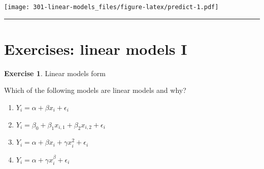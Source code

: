 \documentclass[
]{book}
\newenvironment{Shaded}{\begin{snugshade}}{\end{snugshade}}
\newcommand{\CommentTok}[1]{\textcolor[rgb]{0.56,0.35,0.01}{\textit{#1}}}
\newcommand{\DataTypeTok}[1]{\textcolor[rgb]{0.13,0.29,0.53}{#1}}
\newcommand{\DecValTok}[1]{\textcolor[rgb]{0.00,0.00,0.81}{#1}}
\newcommand{\KeywordTok}[1]{\textcolor[rgb]{0.13,0.29,0.53}{\textbf{#1}}}
\newcommand{\NormalTok}[1]{#1}
\newcommand{\OperatorTok}[1]{\textcolor[rgb]{0.81,0.36,0.00}{\textbf{#1}}}
\newcommand{\StringTok}[1]{\textcolor[rgb]{0.31,0.60,0.02}{#1}}
\providecommand{\tightlist}{%
  \setlength{\itemsep}{0pt}\setlength{\parskip}{0pt}}
\theoremstyle{definition}
\theoremstyle{definition}
\theoremstyle{definition}
\newtheorem{exercise}{Exercise}[chapter]
\theoremstyle{remark}
\begin{document}
\begin{Shaded}
\end{Shaded}

\texttt{[image: 301-linear-models\_files/figure-latex/predict-1.pdf]}

\begin{center}\rule{0.5\linewidth}{0.5pt}\end{center}

\hypertarget{exercises-linear-models-i}{%
\section{Exercises: linear models I}\label{exercises-linear-models-i}}

\begin{exercise}
\protect\hypertarget{exr:lm-recognize}{}{\label{exr:lm-recognize} }Linear models form

Which of the following models are linear models and why?

\begin{enumerate}
\def\labelenumi{\alph{enumi})}
\tightlist
\item
  \(Y_i=\alpha + \beta x_i + \epsilon_i\)
\item
  \(Y_i=\beta_0 + \beta_1 x_{i,1} + \beta_2 x_{i,2} + \epsilon_i\)
\item
  \(Y_i=\alpha + \beta x_i + \gamma x_i^2 + \epsilon_i\)
\item
  \(Y_i=\alpha + \gamma x_i^\beta + \epsilon_i\)
\end{enumerate}
\end{exercise}
\end{document}
